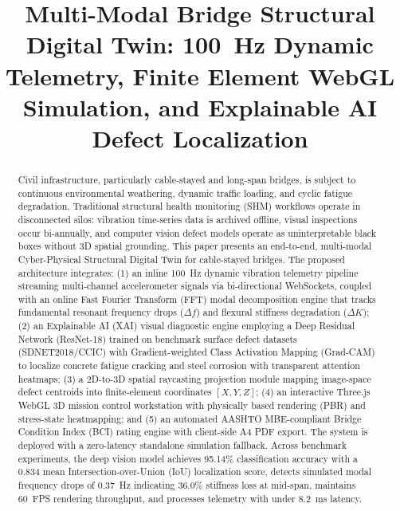 \documentclass[10pt, conference, letterpaper]{IEEEtran}
\begin{document}
\title{Multi-Modal Bridge Structural Digital Twin: 100~Hz Dynamic Telemetry, Finite Element WebGL Simulation, and Explainable AI Defect Localization}

\author{
}

\maketitle

\begin{abstract}
Civil infrastructure, particularly cable-stayed and long-span bridges, is subject to continuous environmental weathering, dynamic traffic loading, and cyclic fatigue degradation. Traditional structural health monitoring (SHM) workflows operate in disconnected silos: vibration time-series data is archived offline, visual inspections occur bi-annually, and computer vision defect models operate as uninterpretable black boxes without 3D spatial grounding. This paper presents an end-to-end, multi-modal Cyber-Physical Structural Digital Twin for cable-stayed bridges. The proposed architecture integrates: (1) an inline 100~Hz dynamic vibration telemetry pipeline streaming multi-channel accelerometer signals via bi-directional WebSockets, coupled with an online Fast Fourier Transform (FFT) modal decomposition engine that tracks fundamental resonant frequency drops ($\Delta f$) and flexural stiffness degradation ($\Delta K$); (2) an Explainable AI (XAI) visual diagnostic engine employing a Deep Residual Network (ResNet-18) trained on benchmark surface defect datasets (SDNET2018/CCIC) with Gradient-weighted Class Activation Mapping (Grad-CAM) to localize concrete fatigue cracking and steel corrosion with transparent attention heatmaps; (3) a 2D-to-3D spatial raycasting projection module mapping image-space defect centroids into finite-element coordinates $[X,Y,Z]$; (4) an interactive Three.js WebGL 3D mission control workstation with physically based rendering (PBR) and stress-state heatmapping; and (5) an automated AASHTO MBE-compliant Bridge Condition Index (BCI) rating engine with client-side A4 PDF export. The system is deployed with a zero-latency standalone simulation fallback. Across benchmark experiments, the deep vision model achieves 95.14\% classification accuracy with a 0.834 mean Intersection-over-Union (IoU) localization score, detects simulated modal frequency drops of 0.37~Hz indicating 36.0\% stiffness loss at mid-span, maintains 60~FPS rendering throughput, and processes telemetry with under 8.2~ms latency.
\end{abstract}
\end{document}
